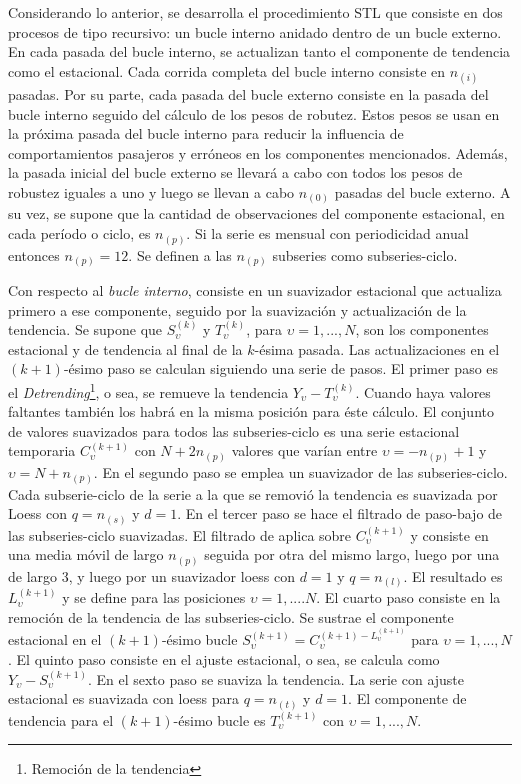 Considerando lo anterior, se desarrolla el procedimiento STL que consiste en dos procesos de tipo recursivo: un bucle interno anidado dentro de un bucle externo. En cada pasada del bucle interno, se actualizan tanto el componente de tendencia como el estacional. Cada corrida completa del bucle interno consiste en $n_{(i)}$ pasadas. Por su parte,  cada pasada del bucle externo consiste en la pasada del bucle interno seguido del cálculo de los pesos de robutez. Estos pesos se usan en la próxima pasada del bucle interno para reducir la influencia de comportamientos pasajeros y erróneos en los componentes mencionados. Además, la pasada inicial del bucle externo se llevará a cabo con todos los pesos de robustez iguales a uno y luego se llevan a cabo $n_{(0)}$ pasadas del bucle externo. A su vez, se supone que la cantidad de observaciones del componente estacional, en cada período o ciclo, es $n_{(p)}$. Si la serie es mensual con periodicidad anual entonces $n_{(p)}=12$. Se definen a las $n_{(p)}$ subseries como subseries-ciclo. 

Con respecto al \textit{bucle interno}, consiste en un suavizador estacional que actualiza primero a ese componente, seguido por la suavización y actualización de la tendencia. Se supone que $S_{\upsilon}^{(k)}$ y $T_{\upsilon}^{(k)}$, para $\upsilon=1,...,N$, son los componentes estacional y de tendencia al final de la $k$-ésima pasada. Las actualizaciones en el $(k+1)$-ésimo paso se calculan siguiendo una serie de pasos. El primer paso es el \textit{Detrending}\footnote{Remoción de la tendencia}, o sea, se remueve la tendencia $Y_{\upsilon}-T_{\upsilon}^{(k)}$. Cuando haya valores faltantes también los habrá en la misma posición para éste cálculo. El conjunto de valores suavizados para todos las subseries-ciclo es una serie estacional temporaria $C_{\upsilon}^{(k+1)}$ con $N+2n_{(p)}$ valores que varían entre $\upsilon=-n_{(p)}+1$ y $\upsilon=N+n_{(p)}$. En el segundo paso se emplea un suavizador de las subseries-ciclo. Cada  subserie-ciclo de la serie a la que se removió la tendencia es suavizada por Loess con $q=n_{(s)}$ y $d=1$. En el tercer paso se hace el filtrado de paso-bajo de las subseries-ciclo suavizadas. El filtrado de aplica sobre $C_{\upsilon}^{(k+1)}$ y consiste en una media móvil de largo $n_{(p)}$ seguida por otra del mismo largo, luego por una de largo 3, y luego por un suavizador loess con $d=1$ y $q=n_{(l)}$. El resultado es $L_{\upsilon}^{(k+1)}$ y se define para las posiciones $\upsilon=1,....N$. El cuarto paso consiste en la remoción de la tendencia de las subseries-ciclo. Se sustrae el componente estacional en el $(k+1)$-ésimo bucle $S_{\upsilon}^{(k+1)}=C_{\upsilon}^{(k+1)-L_{\upsilon}^{(k+1)}}$ para $\upsilon=1,...,N$. El quinto paso consiste en el ajuste estacional, o sea, se calcula como $Y_{\upsilon}-S_{\upsilon}^{(k+1)}$. En el sexto paso se suaviza la tendencia. La serie con ajuste estacional es suavizada con loess para $q=n_{(t)}$ y $d=1$. El componente de tendencia para el $(k+1)$-ésimo bucle es $T_{\upsilon}^{(k+1)}$ con $\upsilon=1,...,N$.


